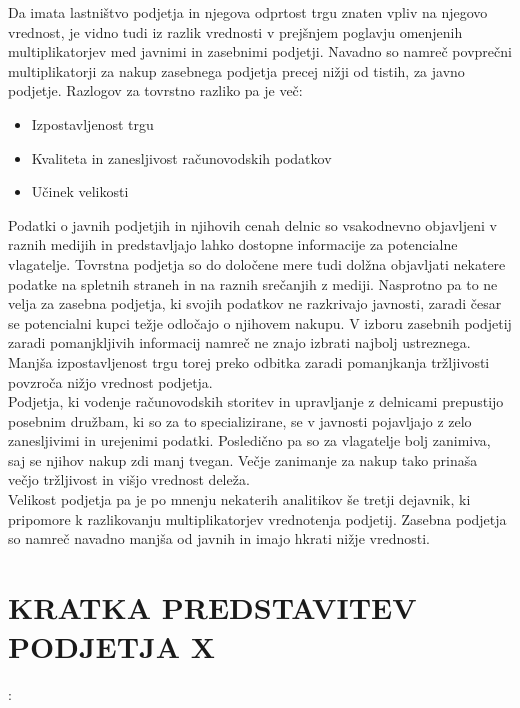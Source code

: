 \documentclass[12pt,a4paper]{amsart}
\theoremstyle{definition} %
\theoremstyle{plain} %
\begin{document}
Da imata lastništvo podjetja in njegova odprtost trgu znaten vpliv na njegovo vrednost, je vidno tudi iz razlik vrednosti v prejšnjem poglavju omenjenih multiplikatorjev med javnimi in zasebnimi podjetji. Navadno so namreč povprečni multiplikatorji za nakup zasebnega podjetja precej nižji od tistih, za javno podjetje. Razlogov za tovrstno razliko pa je več:
\begin{itemize}
\item Izpostavljenost trgu
\item Kvaliteta in zanesljivost računovodskih podatkov 
\item Učinek velikosti
\end{itemize}
Podatki o javnih podjetjih in njihovih cenah delnic so vsakodnevno objavljeni v raznih medijih in predstavljajo lahko dostopne informacije za potencialne vlagatelje. Tovrstna podjetja so do določene mere tudi dolžna objavljati nekatere podatke na spletnih straneh in na raznih srečanjih z mediji. Nasprotno pa to ne velja za zasebna podjetja, ki svojih podatkov ne razkrivajo javnosti, zaradi česar se potencialni kupci težje odločajo o njihovem nakupu. V izboru zasebnih podjetij zaradi pomanjkljivih informacij namreč ne znajo izbrati najbolj ustreznega. Manjša izpostavljenost trgu torej preko odbitka zaradi pomanjkanja tržljivosti povzroča nižjo vrednost podjetja.\\
Podjetja, ki vodenje računovodskih storitev in upravljanje z delnicami prepustijo posebnim družbam, ki so za to specializirane, se v javnosti pojavljajo z zelo zanesljivimi in urejenimi podatki. Posledično pa so za vlagatelje bolj zanimiva, saj se njihov nakup zdi manj tvegan. Večje zanimanje za nakup tako prinaša večjo tržljivost in višjo vrednost deleža.\\
Velikost podjetja pa je po mnenju nekaterih analitikov še tretji dejavnik, ki pripomore k razlikovanju multiplikatorjev vrednotenja podjetij. Zasebna podjetja so namreč navadno manjša od javnih in imajo hkrati nižje vrednosti. \\













\section{\textbf{KRATKA PREDSTAVITEV PODJETJA X}}:\\
\end{document}
